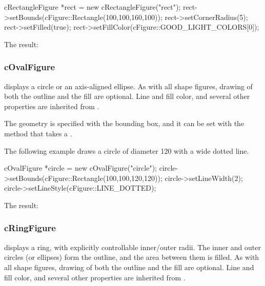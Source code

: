 \begin{cpp}
cRectangleFigure *rect = new cRectangleFigure("rect");
rect->setBounds(cFigure::Rectangle(100,100,160,100));
rect->setCornerRadius(5);
rect->setFilled(true);
rect->setFillColor(cFigure::GOOD_LIGHT_COLORS[0]);
\end{cpp}


The result:

\begin{center}

\end{center}


\subsubsection{cOvalFigure}
\label{sec:graphics:ovalfigure}

 displays a circle or an axis-aligned ellipse. As with
all shape figures, drawing of both the outline and the fill are optional.
Line and fill color, and several other properties are inherited from
.

The geometry is specified with the bounding box, and it can be set with the
 method that takes a .

The following example draws a circle of diameter 120 with a wide dotted line.

\begin{cpp}
cOvalFigure *circle = new cOvalFigure("circle");
circle->setBounds(cFigure::Rectangle(100,100,120,120));
circle->setLineWidth(2);
circle->setLineStyle(cFigure::LINE_DOTTED);
\end{cpp}


The result:

\begin{center}

\end{center}


\subsubsection{cRingFigure}
\label{sec:graphics:ringfigure}

 displays a ring, with explicitly controllable
inner/outer radii. The inner and outer circles (or ellipses) form the
outline, and the area between them is filled. As with all shape figures,
drawing of both the outline and the fill are optional. Line and fill color,
and several other properties are inherited from
.

